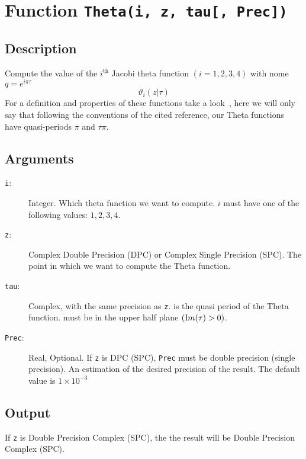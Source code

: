 \section{Function \texttt{Theta(i, z, tau[, Prec])}}

\subsection{Description}

Compute the value of the $i^{\underline{\text{th}}}$ Jacobi theta
function $(i=1,2,3,4)$ with nome $q=e^{i\pi\tau}$ 
\begin{equation}
  \vartheta_i(z|\tau)
\end{equation}
For a definition and properties of these functions take a
look~\cite{ww:analysis}, here we will only say that following the
conventions of the cited reference, our Theta functions have
quasi-periods $\pi$ and $\tau\pi$. 

\subsection{Arguments}

\begin{description}
\item[\texttt{i}:] Integer. Which theta function we
  want to compute. $i$ must have one of the following values: $1,2,3,4$.
\item[\texttt{z}:] Complex Double Precision (DPC) or Complex Single
  Precision (SPC). The point in which we want to compute the Theta
  function.
\item[\texttt{tau}:] Complex, with the same precision as
  \texttt{z}. is the quasi period of the Theta function. must be in
  the upper half plane $(\textrm Im(\tau)> 0)$.
\item[\texttt{Prec}:] Real, Optional. If \texttt{z} is DPC (SPC),
  \texttt{Prec} must be double precision (single precision). An
  estimation of the desired precision of the result. The default value
  is $1\times 10^{-3}$
\end{description}

\subsection{Output}

If \texttt{z} is Double Precision Complex (SPC), the the result will be
Double Precision Complex (SPC).

